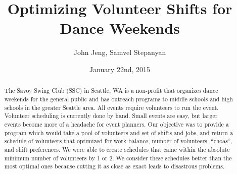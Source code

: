 \documentclass[11pt]{article}
\title{Optimizing Volunteer Shifts for Dance Weekends}
\author{John Jeng, Samvel Stepanyan}
\date{January 22nd, 2015}
\theoremstyle{definition}
\begin{document}
\maketitle
\begin{abstract}
	The Savoy Swing Club (SSC) in Seattle, WA is a non-profit that organizes dance weekends for the general public and has outreach programs to middle schools and high schools in the greater Seattle area. All events require volunteers to run the event. Volunteer scheduling is currently done by hand. Small events are easy, but larger events become more of a headache for event planners. Our objective was to provide a program which would take a pool of volunteers and set of shifts and jobs, and return a schedule of volunteers that optimized for work balance, number of volunteers, ``choas'', and shift preferences. We were able to create schedules that came within the absolute minimum number of volunteers by 1 or 2. We consider these schedules better than the most optimal ones because cutting it as close as exact leads to disastrous problems.
\end{abstract}
\noindent\makebox[\linewidth]{\rule{\textwidth}{0.4pt}}
\end{document}
